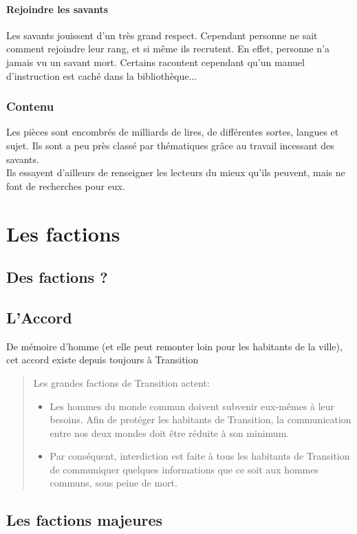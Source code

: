 \documentclass{book}
\begin{document}
\subsubsection{Rejoindre les savants}
Les savants jouissent d'un très grand respect. Cependant personne ne sait comment rejoindre leur rang, et si même ils recrutent. En effet, personne n'a jamais vu un savant mort. Certains racontent cependant qu'un manuel d'instruction est caché dans la bibliothèque...
\subsection{Contenu}
Les pièces sont encombrés de milliards de lires, de différentes sortes, langues et sujet. Ils sont a peu près classé par thématiques grâce au travail incessant des savants.\\
Ils essayent d'ailleurs de renseigner les lecteurs du mieux qu'ils peuvent, mais ne font de recherches pour eux.


\chapter{Les factions}
\section{Des factions ?}
\section{L'Accord}
De mémoire d'homme (et elle peut remonter loin pour les habitants de la ville), cet accord existe depuis toujours à Transition
\begin{quote}
	Les grandes factions de Transition actent:
	\begin{itemize}
		\item Les hommes du monde commun doivent subvenir eux-mêmes à leur besoins. Afin de protéger les habitants de Transition, la communication entre nos deux mondes doit être réduite à son minimum.
		\item Par conséquent, interdiction est faite à tous les habitants de Transition de communiquer quelques informations que ce soit aux hommes communs, sous peine de mort.
	\end{itemize}
\end{quote}
\section{Les factions majeures}
\end{document}
